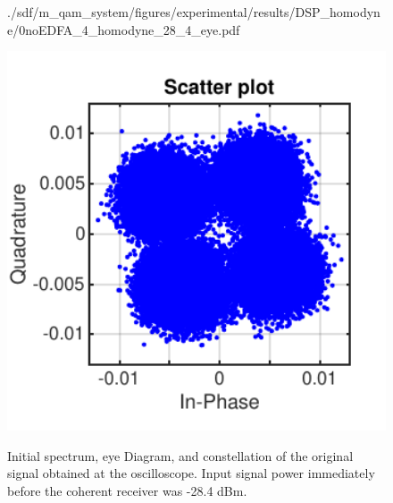 \begin{figure}[H]
\begin{minipage}{0.3\textwidth}
			{./sdf/m_qam_system/figures/experimental/results/DSP_homodyne/0noEDFA_4_homodyne_28_4_eye.pdf}
			\label{fig:16GBdSpecBefFecHm}
		\end{minipage}
		\begin{minipage}{0.3\textwidth}
			\centering
			\includegraphics[width=1\textwidth]
			{./sdf/m_qam_system/figures/experimental/results/DSP_homodyne/0noEDFA_4_homodyne_28_4_const.pdf}\\
			\label{fig:16GBdSpecBefFecCHm}
		\end{minipage}
		\caption{Initial spectrum, eye Diagram, and constellation of the original
			signal obtained at the oscilloscope. Input signal power immediately before the
		coherent receiver was -28.4 dBm.}
		\label{fig:4GBdinitHmi}
	\end{figure}


